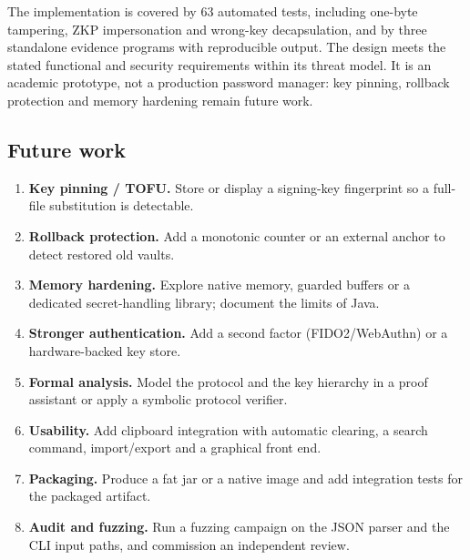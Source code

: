 \documentclass[11pt,a4paper]{article}
\begin{document}
The implementation is covered by 63 automated tests, including one-byte
tampering, ZKP impersonation and wrong-key decapsulation, and by three
standalone evidence programs with reproducible output. The design meets the
stated functional and security requirements within its threat model. It is an
academic prototype, not a production password manager: key pinning, rollback
protection and memory hardening remain future work.

\subsection{Future work}

\begin{enumerate}[leftmargin=*]
  \item \textbf{Key pinning / TOFU.} Store or display a signing-key fingerprint
        so a full-file substitution is detectable.
  \item \textbf{Rollback protection.} Add a monotonic counter or an external
        anchor to detect restored old vaults.
  \item \textbf{Memory hardening.} Explore native memory, guarded buffers or a
        dedicated secret-handling library; document the limits of Java.
  \item \textbf{Stronger authentication.} Add a second factor (FIDO2/WebAuthn) or
        a hardware-backed key store.
  \item \textbf{Formal analysis.} Model the protocol and the key hierarchy in a
        proof assistant or apply a symbolic protocol verifier.
  \item \textbf{Usability.} Add clipboard integration with automatic clearing,
        a search command, import/export and a graphical front end.
  \item \textbf{Packaging.} Produce a fat jar or a native image and add
        integration tests for the packaged artifact.
  \item \textbf{Audit and fuzzing.} Run a fuzzing campaign on the JSON parser and
        the CLI input paths, and commission an independent review.
\end{enumerate}
\end{document}
